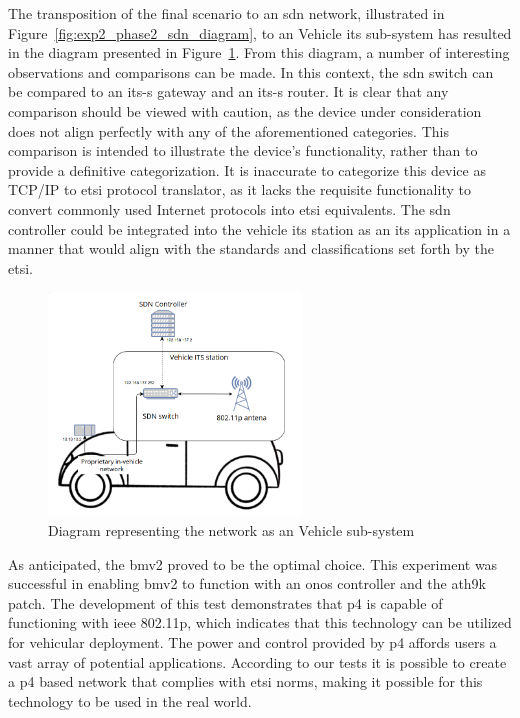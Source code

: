The transposition of the final scenario to an \gls{sdn} network, illustrated in Figure~\ref{fig:exp2_phase2_sdn_diagram}, to an Vehicle \gls{its} sub-system has resulted in the diagram presented in Figure~\ref{fig:exp2_vehicle_subsystem}. From this diagram, a number of interesting observations and comparisons can be made. 
In this context, the \gls{sdn} switch can be compared to an \gls{its-s} gateway and an \gls{its-s} router. It is clear that any comparison should be viewed with caution, as the device under consideration does not align perfectly with any of the aforementioned categories. This comparison is intended to illustrate the device's functionality, rather than to provide a definitive categorization. It is inaccurate to categorize this device as TCP/IP to \gls{etsi} protocol translator, as it lacks the requisite functionality to convert commonly used Internet protocols into \gls{etsi} equivalents.
The \gls{sdn} controller could be integrated into the vehicle \gls{its} station as an \gls{its} application in a manner that would align with the standards and classifications set forth by the \gls{etsi}.

\begin{figure}
	\centering
	\includegraphics[width=0.6\textwidth]{Chapters/Figures/tests/bmv2_phase_2/its_vehicle_diagram.PNG}
	\caption{Diagram representing the  network as an Vehicle  sub-system}
	\label{fig:exp2_vehicle_subsystem}
\end{figure}

As anticipated, the \gls{bmv2} proved to be the optimal choice. This experiment was successful in enabling \gls{bmv2} to function with an \gls{onos} controller and the ath9k patch. The development of this test demonstrates that \gls{p4} is capable of functioning with \gls{ieee} 802.11p, which indicates that this technology can be utilized for vehicular deployment. The power and control provided by \gls{p4} affords users a vast array of potential applications. According to our tests it is possible to create a \gls{p4} based network that complies with \gls{etsi} norms, making it possible for this technology to be used in the real world.

